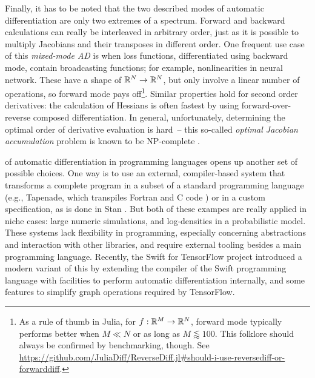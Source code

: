 Finally, it has to be noted that the two described modes of automatic differentiation are only two
extremes of a spectrum.  Forward and backward calculations can really be interleaved in arbitrary
order, just as it is possible to multiply Jacobians and their transposes in different order.  One
frequent use case of this \emph{mixed-mode AD} is when loss functions, differentiated using backward
mode, contain broadcasting functions; for example, nonlinearities in neural network.  These have a
shape of \(\mathbb{R}^N \to \mathbb{R}^N\), but only involve a linear number of operations, so forward mode pays
off\footnote{As a rule of thumb in Julia, for \(f: \mathbb{R}^M \to \mathbb{R}^N\), forward mode typically
  performs better when \(M \ll N\) or as long as \(M \lessapprox 100\).  This folklore should always
  be confirmed by benchmarking, though.  See
  \url{https://github.com/JuliaDiff/ReverseDiff.jl\#should-i-use-reversediff-or-forwarddiff}.}.
Similar properties hold for second order derivatives: the calculation of Hessians is often fastest
by using forward-over-reverse composed differentiation.  In general, unfortunately, determining the
optimal order of derivative evaluation is hard~-- this so-called \emph{optimal Jacobian
  accumulation} problem is known to be NP-complete \parencite{naumann2007optimal}.

 of automatic differentiation in programming languages
opens up another set of possible choices.  One way is to use an external, compiler-based system that
transforms a complete program in a subset of a standard programming language (e.g., Tapenade, which
transpiles Fortran and C code \parencite{tapenadedevelopers2019tapenade}) or in a custom
specification, as is done in Stan \parencite{carpenter2015stan}.  But both of these exampes are
really applied in niche cases: large numeric simulations, and log-densities in a probabilistic
model.  These systems lack flexibility in programming, especially concerning abstractions and
interaction with other libraries, and require external tooling besides a main programming language.
Recently, the Swift for TensorFlow project \parencite{tensorflowdevelopers2018swift,hong2018graph}
introduced a modern variant of this by extending the compiler of the Swift programming language with
facilities to perform automatic differentiation internally, and some features to simplify graph
operations required by TensorFlow.

